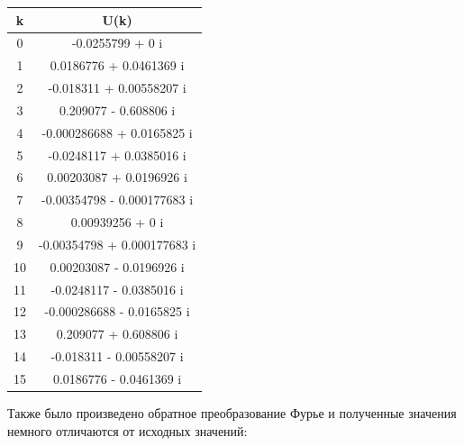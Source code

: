 \documentclass[diploma]{nanolab2015}
\begin{document}
 \vspace{0.5 cm}
  \begin{tabular}{|c|c|}
  \hline 
  k & U(k) \\ 
  \hline 
  0 & -0.0255799 + 0 i \\ 
  \hline 
  1 & 0.0186776 + 0.0461369 i \\ 
  \hline 
  2 & -0.018311 + 0.00558207 i \\ 
  \hline 
  3 &  0.209077 -  0.608806 i \\ 
  \hline 
  4 &  -0.000286688 + 0.0165825 i \\ 
  \hline 
  5 &  -0.0248117 + 0.0385016 i \\ 
  \hline 
  6 & 0.00203087 + 0.0196926 i \\ 
  \hline 
  7 &  -0.00354798 - 0.000177683 i \\ 
  \hline 
  8 & 0.00939256 + 0 i \\ 
  \hline 
  9 & -0.00354798 + 0.000177683 i \\ 
  \hline 
  10 & 0.00203087 - 0.0196926 i \\ 
  \hline 
  11 & -0.0248117 - 0.0385016 i \\ 
  \hline 
  12 & -0.000286688 - 0.0165825 i \\ 
  \hline 
  13 & 0.209077 + 0.608806 i \\ 
  \hline 
  14 & -0.018311 - 0.00558207 i \\ 
  \hline 
  15 &  0.0186776 - 0.0461369 i \\ 
  \hline 
  \end{tabular} 
  
 \vspace{0.5 cm} 
  Также было произведено обратное преобразование Фурье и полученные значения немного отличаются от исходных значений:
  
\end{document}
